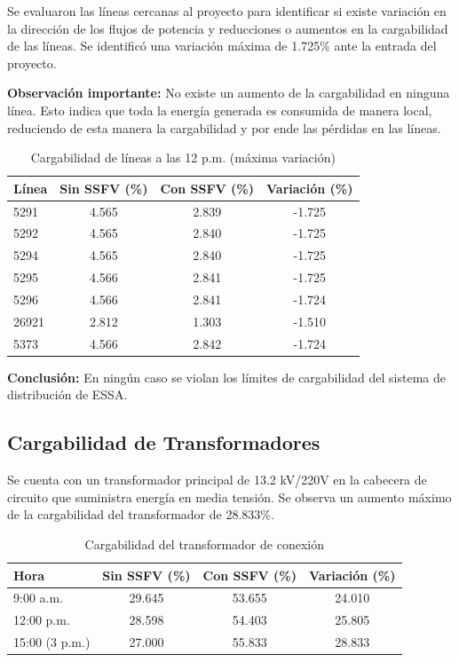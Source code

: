 Se evaluaron las líneas cercanas al proyecto para identificar si existe variación en la dirección de los flujos de potencia y reducciones o aumentos en la cargabilidad de las líneas. Se identificó una variación máxima de 1.725\% ante la entrada del proyecto.

\textbf{Observación importante:} No existe un aumento de la cargabilidad en ninguna línea. Esto indica que toda la energía generada es consumida de manera local, reduciendo de esta manera la cargabilidad y por ende las pérdidas en las líneas.

\begin{table}[H]
    \centering
    \caption{Cargabilidad de líneas a las 12 p.m. (máxima variación)}
    \begin{tabular}{lccc}
    \toprule
    \textbf{Línea} & \textbf{Sin SSFV (\%)} & \textbf{Con SSFV (\%)} & \textbf{Variación (\%)} \\
    \midrule
    5291 & 4.565 & 2.839 & -1.725 \\
    5292 & 4.565 & 2.840 & -1.725 \\
    5294 & 4.565 & 2.840 & -1.725 \\
    5295 & 4.566 & 2.841 & -1.725 \\
    5296 & 4.566 & 2.841 & -1.724 \\
    26921 & 2.812 & 1.303 & -1.510 \\
    5373 & 4.566 & 2.842 & -1.724 \\
    \bottomrule
    \end{tabular}
\end{table}

\textbf{Conclusión:} En ningún caso se violan los límites de cargabilidad del sistema de distribución de ESSA.

\subsection{Cargabilidad de Transformadores}

Se cuenta con un transformador principal de 13.2 kV/220V en la cabecera de circuito que suministra energía en media tensión. Se observa un aumento máximo de la cargabilidad del transformador de 28.833\%.

\begin{table}[H]
    \centering
    \caption{Cargabilidad del transformador de conexión}
    \begin{tabular}{lccc}
    \toprule
    \textbf{Hora} & \textbf{Sin SSFV (\%)} & \textbf{Con SSFV (\%)} & \textbf{Variación (\%)} \\
    \midrule
    9:00 a.m. & 29.645 & 53.655 & 24.010 \\
    12:00 p.m. & 28.598 & 54.403 & 25.805 \\
    15:00 (3 p.m.) & 27.000 & 55.833 & 28.833 \\
    \bottomrule
    \end{tabular}
\end{table}

